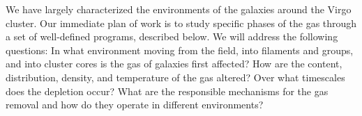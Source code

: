\documentclass[11pt]{article}
\begin{document}
We have largely characterized the environments of the galaxies around the Virgo cluster. Our immediate plan of work is to study specific phases of the gas through a set of well-defined programs, described below.   We will address the following questions: In what environment moving from the field, into filaments and groups, and into cluster cores is the gas of galaxies first affected?  How are the content, distribution, density, and temperature of the gas altered?  Over what timescales does the depletion occur?  What are the responsible mechanisms for the gas removal and how do they operate in different environments?  




\end{document}

